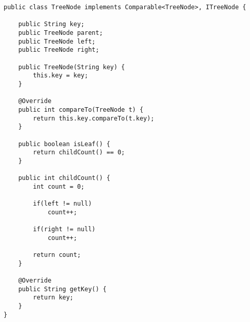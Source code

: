 \begin{lstlisting}[caption=BinaryTree classes Source code - TreeNode]
public class TreeNode implements Comparable<TreeNode>, ITreeNode {

	public String key;
	public TreeNode parent;
	public TreeNode left;
	public TreeNode right;
	
	public TreeNode(String key) {
		this.key = key;
	}

	@Override
	public int compareTo(TreeNode t) {
		return this.key.compareTo(t.key);
	}
	
	public boolean isLeaf() {
		return childCount() == 0;
	}
	
	public int childCount() {
		int count = 0;
		
		if(left != null)
			count++;
		
		if(right != null)
			count++;
		
		return count;
	}

	@Override
	public String getKey() {
		return key;
	}
}
\end{lstlisting}